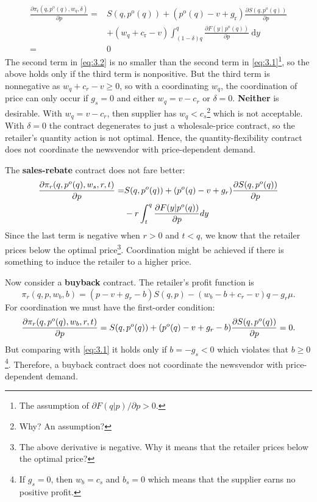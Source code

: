 \begin{align}
\frac{\partial \pi_{\mathrm{r}}\left(q, p^{\mathrm{o}}(q), w_{q}, \delta\right)}{\partial p}=& S\left(q, p^{\mathrm{o}}(q)\right)+\left(p^{\mathrm{o}}(q)-v+g_{\mathrm{r}}\right) \frac{\partial S\left(q, p^{\mathrm{o}}(q)\right)}{\partial p} \nonumber\\
&+\left(w_{q}+c_{\mathrm{r}}-v\right) \int_{(1-\delta) q}^{q} \frac{\partial F\left(y \mid p^{\mathrm{o}}(q)\right)}{\partial p} \mathrm{~d} y \nonumber\\
=& 0\label{eq:3.2}
\end{align}
The second term in \autoref{eq:3.2} is no smaller than the second term in \autoref{eq:3.1}\footnote{The assumption of $\partial F(q|p)/\partial p>0.$}, so the above holds only if the third term is nonpositive. 
But the third term is nonnegative as $w_q+c_r-v\geq 0$, so with a coordinating $w_q$, the coordination of price can only occur if $g_s=0$ and either $w_q=v-c_r$ or $\delta=0$. \textbf{Neither} is desirable. With $w_q=v-c_r$, then supplier has $w_q<c_s$\footnote{Why? An assumption?} which is not acceptable. With $\delta=0$ the contract degenerates to just a wholesale-price contract, so the retailer's quantity action is not optimal. Hence, the quantity-flexibility contract does not coordinate the newsvendor with price-dependent demand.

The \textbf{sales-rebate} contract does not fare better:
\begin{align*}
    \frac{\partial\pi_r(q,p^o(q),w_s,r,t)}{\partial p}=&S(q,p^o(q))+(p^o(q)-v+g_r)\frac{\partial S(q,p^o(q))}{\partial p}\\
    &-r\int_t^q\frac{\partial F(y|p^o(q))}{\partial p}dy
\end{align*}
Since the last term is negative when $r>0$ and $t<q$, we know that the retailer prices below the optimal price\footnote{The above derivative is negative. Why it means that the retailer prices below the optimal price?}. Coordination might be achieved if there is something to induce the retailer to a higher price.

Now consider a \textbf{buyback} contract. The retailer's profit function is 
\begin{equation*}
    \pi_r(q,p,w_b,b)=(p-v+g_r-b)S(q,p)-(w_b-b+c_r-v)q-g_r\mu.
\end{equation*}
For coordination we must have the first-order condition:
\begin{equation}\label{eq:3.3}
    \frac{\partial\pi_r(q,p^o(q),w_b,r,t)}{\partial p}=S(q,p^o(q))+(p^o(q)-v+g_r-b)\frac{\partial S(q,p^o(q))}{\partial p}=0.
\end{equation}
But comparing with \autoref{eq:3.1} it holds only if $b=-g_s< 0$ which violates that $b\geq 0$\footnote{If $g_s=0$, then $w_b=c_s$ and $b_s=0$ which means that the supplier earns no positive profit.\label{ft:4}}. Therefore, a buyback contract does not coordinate the newsvendor with price-dependent demand.


